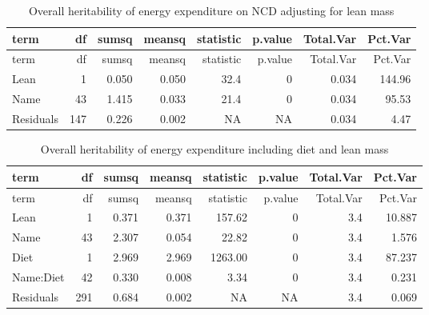 \documentclass[]{article}
\newenvironment{Shaded}{\begin{snugshade}}{\end{snugshade}}
\newcommand{\DataTypeTok}[1]{\textcolor[rgb]{0.13,0.29,0.53}{#1}}
\newcommand{\DecValTok}[1]{\textcolor[rgb]{0.00,0.00,0.81}{#1}}
\newcommand{\KeywordTok}[1]{\textcolor[rgb]{0.13,0.29,0.53}{\textbf{#1}}}
\newcommand{\NormalTok}[1]{#1}
\newcommand{\OperatorTok}[1]{\textcolor[rgb]{0.81,0.36,0.00}{\textbf{#1}}}
\newcommand{\StringTok}[1]{\textcolor[rgb]{0.31,0.60,0.02}{#1}}
\begin{document}
\begin{longtable}[]{@{}lrrrrrrr@{}}
\caption{Overall heritability of energy expenditure on NCD adjusting for
lean mass}\tabularnewline
\toprule
term & df & sumsq & meansq & statistic & p.value & Total.Var &
Pct.Var\tabularnewline
\midrule
\endfirsthead
\toprule
term & df & sumsq & meansq & statistic & p.value & Total.Var &
Pct.Var\tabularnewline
\midrule
\endhead
Lean & 1 & 0.050 & 0.050 & 32.4 & 0 & 0.034 & 144.96\tabularnewline
Name & 43 & 1.415 & 0.033 & 21.4 & 0 & 0.034 & 95.53\tabularnewline
Residuals & 147 & 0.226 & 0.002 & NA & NA & 0.034 & 4.47\tabularnewline
\bottomrule
\end{longtable}

\begin{Shaded}
\end{Shaded}

\begin{longtable}[]{@{}lrrrrrrr@{}}
\caption{Overall heritability of energy expenditure including diet and
lean mass}\tabularnewline
\toprule
term & df & sumsq & meansq & statistic & p.value & Total.Var &
Pct.Var\tabularnewline
\midrule
\endfirsthead
\toprule
term & df & sumsq & meansq & statistic & p.value & Total.Var &
Pct.Var\tabularnewline
\midrule
\endhead
Lean & 1 & 0.371 & 0.371 & 157.62 & 0 & 3.4 & 10.887\tabularnewline
Name & 43 & 2.307 & 0.054 & 22.82 & 0 & 3.4 & 1.576\tabularnewline
Diet & 1 & 2.969 & 2.969 & 1263.00 & 0 & 3.4 & 87.237\tabularnewline
Name:Diet & 42 & 0.330 & 0.008 & 3.34 & 0 & 3.4 & 0.231\tabularnewline
Residuals & 291 & 0.684 & 0.002 & NA & NA & 3.4 & 0.069\tabularnewline
\bottomrule
\end{longtable}
\end{document}
